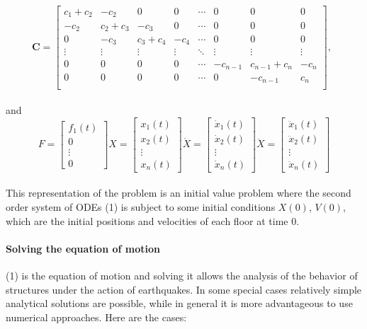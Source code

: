 \documentclass{article}
\begin{document}
				\begin{equation*}
					\textbf{C}=
					\begin{bmatrix}
					           c_1 + c_2 & -c_2 & 0 & 0 & \cdots & 0 & 0 & 0\\
						-c_2 &  c_2 + c_3 & -c_3 & 0 & \cdots & 0 & 0 & 0\\
						0& -c_3 & c_3 + c_4 & -c_4 & \cdots & 0 & 0 & 0\\
						\vdots & \vdots & \vdots & \vdots & \ddots & \vdots & \vdots & \vdots \\
						0& 0 & 0 & 0 & \cdots & -c_{n-1} & c_{n-1}+c_{n} & -c_{n}\\
						0& 0 & 0 & 0 & \cdots & 0 &-c_{n-1} & c_{n}\\
					\end{bmatrix},\ \ 
				\end{equation*}\\
and
				\begin{equation*}
					F=
					\begin{bmatrix}
						f_1(t)\\
						0\\
						\vdots \\
						0
					\end{bmatrix}
					X=
					\begin{bmatrix}
						x_1(t)\\
						x_2(t)\\
						\vdots \\
						x_n(t)
					\end{bmatrix}
					\dot{X}=
					\begin{bmatrix}
						\dot{x}_1(t)\\
						\dot{x}_2(t)\\
						\vdots \\
						\dot{x}_n(t)
					\end{bmatrix}
					\ddot{X}=
					\begin{bmatrix}
						\ddot{x}_1(t)\\
						\ddot{x}_2(t)\\
						\vdots \\
						\ddot{x}_n(t)
					\end{bmatrix}
				\end{equation*}
\\
This representation of the problem is an initial value problem where the second order system of ODEs (1) is subject to some initial conditions $X(0)$, $V(0)$, which are the initial positions and velocities of each floor at time 0. 
				\paragraph{Solving the equation of motion} (1) is the equation of motion and solving it allows the analysis of the behavior of structures under the action of earthquakes. In some special cases relatively simple analytical solutions are possible, while in general it is more advantageous to use numerical approaches. Here are the cases:
\\
			
\end{document}
